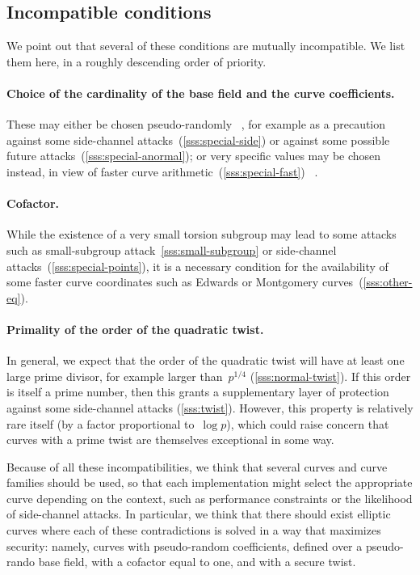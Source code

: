 \documentclass[twocolumn,letterpaper,10pt]{article}
\begin{document}
\bigbreak

\subsection*{Incompatible conditions}
We point out that several of these conditions are mutually incompatible.
We list them here, in a roughly descending order of priority.

\paragraph{Choice of the cardinality of the base field
and the curve coefficients.}
These may either be chosen pseudo-randomly~%
\cite{rfc5639,jorf2011ce}, for example
as a precaution against some side-channel attacks~(\ref{sss:special-side})
or against some possible future attacks~(\ref{sss:special-anormal});
or very specific values may be chosen instead,
in view of faster curve arithmetic~(\ref{sss:special-fast})~%
\cite{nist2000fips186-2,pkc2006bernstein,oscca2010sm2}.

\paragraph{Cofactor.}
While the existence of a very small torsion subgroup
may lead to some attacks such as
small-subgroup attack~\ref{sss:small-subgroup}
or side-channel attacks~(\ref{sss:special-points}),
it is a necessary condition for the availability
of some faster curve coordinates
such as Edwards or Montgomery curves~(\ref{sss:other-eq}).

\paragraph{Primality of the order of the quadratic twist.}
In general, we expect that the order of the quadratic twist
will have at least one large prime divisor,
for example larger than~$p^{1/4}$ (\ref{sss:normal-twist}).
If this order is itself a prime number,
then this grants a supplementary layer of protection
against some side-channel attacks (\ref{sss:twist}).
However, this property is relatively rare itself
(by a factor proportional to~$\log p$),
which could raise concern that
curves with a prime twist are themselves exceptional in some way.

\medskip

Because of all these incompatibilities,
we think that several curves and curve families should be used,
so that each implementation might select the appropriate curve
depending on the context,
such as performance constraints or the likelihood of side-channel attacks.
In particular, we think that there should exist elliptic curves
where each of these contradictions is solved in a way
that maximizes security:
namely, curves with pseudo-random coefficients,
defined over a pseudo-rando base field,
with a cofactor equal to one, and with a secure twist.
\end{document}
